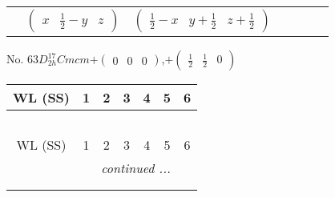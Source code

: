 \documentclass[fleqn,9pt,landscape]{jsarticle}
\begin{document}
\begin{center}
\begin{longtable}{ccccccc}
& $ \begin{pmatrix} x & \frac{1}{2} - y & z \end{pmatrix} $ & $ \begin{pmatrix} \frac{1}{2} - x & y + \frac{1}{2} & z + \frac{1}{2} \end{pmatrix} $ & $  $ & $  $ & $  $ & $  $ \\
\end{longtable}
\end{center}
\newpage
No. 63\quad$D_{2h}^{17}$\quad$Cmcm$\quad[ orthorhombic ]\quad$+\begin{pmatrix} 0 & 0 & 0 \end{pmatrix}$,\quad $+\begin{pmatrix} \frac{1}{2} & \frac{1}{2} & 0 \end{pmatrix}$
\begin{center}
\renewcommand{\arraystretch}{1.2}
\begin{longtable}{ccccccc}
 \hline \hline
WL (SS) & 1 & 2 & 3 & 4 & 5 & 6 \\ \hline \endfirsthead

\multicolumn{6}{l}{\tablename\ \thetable{}} \\
 \hline \hline
WL (SS) & 1 & 2 & 3 & 4 & 5 & 6 \\ \hline \endhead

 \hline \hline
\multicolumn{6}{r}{\footnotesize\it continued ...} \\ \endfoot

 \hline \hline
\multicolumn{6}{r}{} \\ \endlastfoot


\end{longtable}
\end{center}
\end{document}
